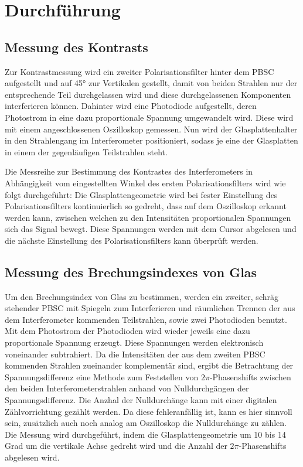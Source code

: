 

\section{Durchführung}


\subsection{Messung des Kontrasts}
Zur Kontrastmessung wird ein zweiter Polarisationsfilter hinter dem PBSC aufgestellt und auf 45° zur Vertikalen gestellt, damit von beiden Strahlen nur der entsprechende Teil durchgelassen wird und diese durchgelassenen Komponenten interferieren können. Dahinter wird eine Photodiode aufgestellt, deren Photostrom in eine dazu proportionale Spannung umgewandelt wird. Diese wird mit einem angeschlossenen Oszilloskop gemessen. Nun wird der Glasplattenhalter in den Strahlengang im Interferometer positioniert, sodass je eine der Glasplatten in einem der gegenläufigen Teilstrahlen steht.

Die Messreihe zur Bestimmung des Kontrastes des Interferometers in Abhängigkeit vom eingestellten Winkel des ersten Polarisationsfilters wird wie folgt durchgeführt: Die Glasplattengeometrie wird bei fester Einstellung des Polarisationsfilters kontinuierlich so gedreht, dass auf dem Oszilloskop erkannt werden kann, zwischen welchen zu den Intensitäten proportionalen Spannungen sich das Signal bewegt. Diese Spannungen werden mit dem Cursor abgelesen und die nächste Einstellung des Polarisationsfilters kann überprüft werden.

\subsection{Messung des Brechungsindexes von Glas}
\label{subsec:glas}
Um den Brechungsindex von Glas zu bestimmen, werden ein zweiter, schräg stehender PBSC mit Spiegeln zum Interferieren und räumlichen Trennen der aus dem Interferometer kommenden Teilstrahlen, sowie zwei Photodioden benutzt. Mit dem Photostrom der Photodioden wird wieder jeweils eine dazu proportionale Spannung erzeugt. Diese Spannungen werden elektronisch voneinander subtrahiert. Da die Intensitäten der aus dem zweiten PBSC kommenden Strahlen zueinander komplementär sind, ergibt die Betrachtung der Spannungsdifferenz eine Methode zum Feststellen von $2\pi$-Phasenshifts zwischen den beiden Interferometerstrahlen anhand von Nulldurchgängen der Spannungsdifferenz. Die Anzhal der Nulldurchänge kann mit einer digitalen Zählvorrichtung gezählt werden. Da diese fehleranfällig ist, kann es hier sinnvoll sein, zusätzlich auch noch analog am Oszilloskop die Nulldurchänge zu zählen. Die Messung wird durchgeführt, indem die Glasplattengeometrie um 10 bis 14 Grad um die vertikale Achse gedreht wird und die Anzahl der $2\pi$-Phasenshifts abgelesen wird.


